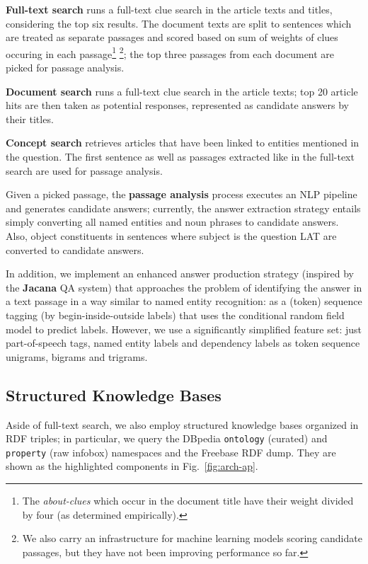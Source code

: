 \textbf{Full-text search} \citep{WatsonIR} runs a full-text clue search in the article texts and titles,
considering the top six results.
The document texts are split to sentences which are treated as separate passages
and scored based on sum of weights of clues occuring in each passage\footnote{%
The \textit{about-clues} which occur in the document title have their weight divided by four (as determined empirically).}%
\footnote{We also carry an infrastructure for machine learning models scoring candidate passages,
		but they have not been improving performance so far.};
the top three passages from each document are picked for passage analysis.

\textbf{Document search} \citep{WatsonIR} runs a full-text clue search in the article texts;
top 20 article hits are then taken as potential responses,
represented as candidate answers by their titles.

\textbf{Concept search} retrieves articles that have been linked to entities mentioned in the question.
The first sentence as well as passages extracted like in the full-text search are used for passage analysis.

Given a picked passage, the \textbf{passage analysis} process executes an NLP pipeline and generates candidate answers;
currently, the answer extraction strategy entails simply converting all named entities and noun phrases to candidate answers.
Also, object constituents in sentences where subject is the question LAT are converted to candidate answers.

In addition, we implement
an enhanced answer production strategy (inspired by the \textbf{Jacana} QA system)
that approaches the problem of identifying
the answer in a text passage in a way similar to named entity recognition: as
a (token) sequence tagging (by begin-inside-outside labels) that uses the conditional
random field model to predict labels.  \citep{TreeEdit2013Yao}
However, we use a significantly simplified feature set: just part-of-speech tags,
named entity labels and dependency labels as token sequence unigrams, bigrams and trigrams.

\subsection{Structured Knowledge Bases}

Aside of full-text search, we also employ structured knowledge bases organized in RDF triples;
in particular, we query the DBpedia \texttt{ontology} (curated) and \texttt{property} (raw infobox)
namespaces and the Freebase RDF dump.
They are shown as the highlighted components in Fig.~\ref{fig:arch-ap}.

